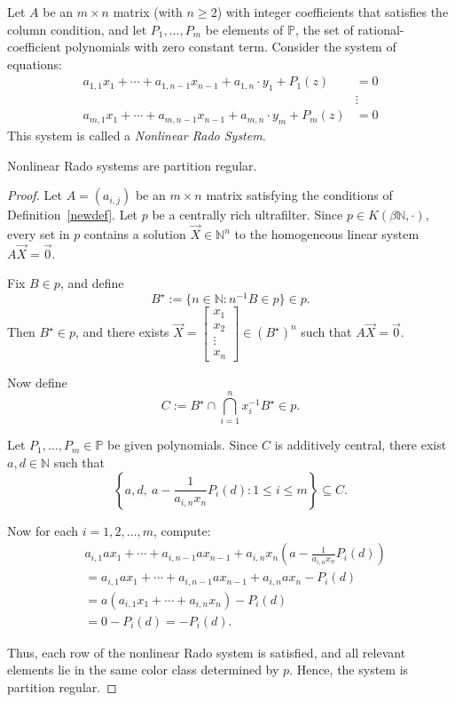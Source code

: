 \documentclass[10pt,a4paper]{amsart}
\begin{document}
\begin{defn}\label{newdef}
    Let \( A \) be an \( m \times n \) matrix (with \( n \geq 2 \)) with integer coefficients that satisfies the column condition, and let \( P_1, \ldots, P_m \) be elements of \( \mathbb{P} \), the set of rational-coefficient polynomials with zero constant term. Consider the system of equations:
    \begin{align*}
        a_{1,1}x_1 + \cdots + a_{1,n-1}x_{n-1} + a_{1,n} \cdot y_1 + P_1(z) &= 0 \\
        &\vdots \\
        a_{m,1}x_1 + \cdots + a_{m,n-1}x_{n-1} + a_{m,n} \cdot y_m + P_m(z) &= 0
    \end{align*}
    This system is called a \emph{Nonlinear Rado System}.
\end{defn}

\begin{thm}\label{ho}
    Nonlinear Rado systems are partition regular.
\end{thm}

\begin{proof}
Let \( A = (a_{i,j}) \) be an \( m \times n \) matrix satisfying the conditions of Definition~\ref{newdef}.  
Let \( p \) be a centrally rich ultrafilter. Since \( p \in K(\beta \mathbb{N}, \cdot) \), every set in \( p \) contains a solution \( \vec{X} \in \mathbb{N}^n \) to the homogeneous linear system \( A\vec{X} = \vec{0} \).

Fix \( B \in p \), and define
\[
B^\star := \{ n \in \mathbb{N} : n^{-1}B \in p \} \in p.
\]
Then \( B^\star \in p \), and there exists \( \vec{X} = \begin{bmatrix} x_1 \\ x_2 \\ \vdots \\ x_n \end{bmatrix} \in (B^\star)^n \) such that \( A\vec{X} = \vec{0} \).

Now define
\[
C := B^\star \cap \bigcap_{i=1}^n x_i^{-1} B^\star \in p.
\]

Let \( P_1, \ldots, P_m \in \mathbb{P} \) be given polynomials. Since \( C \) is additively central, there exist \( a, d \in \mathbb{N} \) such that
\[
\left\{ a, d,\ a - \frac{1}{a_{i,n} x_n} P_i(d) : 1 \leq i \leq m \right\} \subseteq C.
\]

Now for each \( i = 1, 2, \ldots, m \), compute:
\[
\begin{aligned}
& a_{i,1} a x_1 + \cdots + a_{i,n-1} a x_{n-1} + a_{i,n} x_n \left( a - \frac{1}{a_{i,n} x_n} P_i(d) \right) \\
&= a_{i,1} a x_1 + \cdots + a_{i,n-1} a x_{n-1} + a_{i,n} a x_n - P_i(d) \\
&= a \left( a_{i,1} x_1 + \cdots + a_{i,n} x_n \right) - P_i(d) \\
&= 0 - P_i(d) = -P_i(d).
\end{aligned}
\]

Thus, each row of the nonlinear Rado system is satisfied, and all relevant elements lie in the same color class determined by \( p \). Hence, the system is partition regular.
\end{proof}
\end{document}
